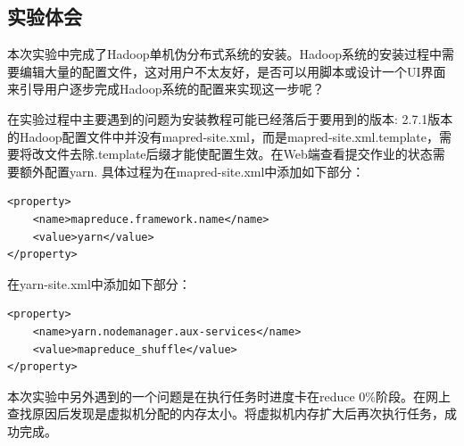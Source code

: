 \documentclass[a4paper,UTF8]{article}
\theoremstyle{definition}
\begin{document}
\begin{CJK}{UTF8}{gkai}
\begin{CJK*}{UTF8}{gbsn}
\section*{实验体会}
\end{CJK*}
\par 本次实验中完成了Hadoop单机伪分布式系统的安装。Hadoop系统的安装过程中需要编辑大量的配置文件，这对用户不太友好，是否可以用脚本或设计一个UI界面来引导用户逐步完成Hadoop系统的配置来实现这一步呢？
\par 在实验过程中主要遇到的问题为安装教程可能已经落后于要用到的版本: 2.7.1版本的Hadoop配置文件中并没有mapred-site.xml，而是mapred-site.xml.template，需要将改文件去除.template后缀才能使配置生效。在Web端查看提交作业的状态需要额外配置yarn. 具体过程为在mapred-site.xml中添加如下部分：
\begin{lstlisting}[escapeinside=``]
<property>
	<name>mapreduce.framework.name</name>
	<value>yarn</value>
</property>
\end{lstlisting}
在yarn-site.xml中添加如下部分：
\begin{lstlisting}[escapeinside=``]
<property>
	<name>yarn.nodemanager.aux-services</name>
	<value>mapreduce_shuffle</value>
</property>
\end{lstlisting}
	\par 本次实验中另外遇到的一个问题是在执行任务时进度卡在reduce 0\%阶段。在网上查找原因后发现是虚拟机分配的内存太小。将虚拟机内存扩大后再次执行任务，成功完成。
\end{CJK}
\end{document}
